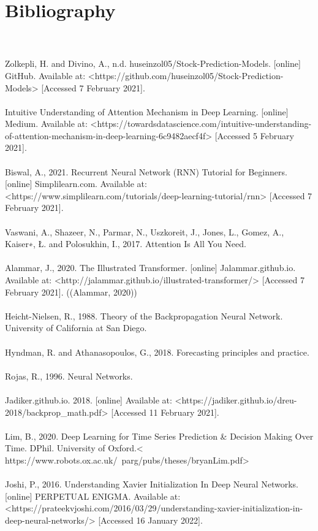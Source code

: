 \documentclass{article}
\begin{document}
\section{Bibliography}
\\
\\
Zolkepli, H. and Divino, A., n.d. huseinzol05/Stock-Prediction-Models. [online] GitHub. Available at: <https://github.com/huseinzol05/Stock-Prediction-Models> [Accessed 7 February 2021].
\\
\\Intuitive Understanding of Attention Mechanism in Deep Learning. [online] Medium. Available at: <https://towardsdatascience.com/intuitive-understanding-of-attention-mechanism-in-deep-learning-6c9482aecf4f> [Accessed 5 February 2021].
\\\\
Biswal, A., 2021. Recurrent Neural Network (RNN) Tutorial for Beginners. [online] Simplilearn.com. Available at: <https://www.simplilearn.com/tutorials/deep-learning-tutorial/rnn> [Accessed 7 February 2021].
\\\\
Vaswani, A., Shazeer, N., Parmar, N., Uszkoreit, J., Jones, L., Gomez, A., Kaiser∗, Ł. and Polosukhin, I., 2017. Attention Is All You Need.
\\\\
Alammar, J., 2020. The Illustrated Transformer. [online] Jalammar.github.io. Available at: <http://jalammar.github.io/illustrated-transformer/> [Accessed 7 February 2021].
((Alammar, 2020))
\\
\\Heicht-Nielsen, R., 1988. Theory of the Backpropagation Neural Network. University of California at San Diego.
\\\\
Hyndman, R. and Athanasopoulos, G., 2018. Forecasting principles and practice.
\\\\
Rojas, R., 1996. Neural Networks.
\\\\
Jadiker.github.io. 2018. [online] Available at: <https://jadiker.github.io/dreu-2018/backprop_math.pdf> [Accessed 11 February 2021].
\\\\
Lim, B., 2020. Deep Learning for Time Series Prediction & Decision Making Over Time. DPhil. University of Oxford.< https://www.robots.ox.ac.uk/~parg/pubs/theses/bryanLim.pdf>
\\\\
Joshi, P., 2016. Understanding Xavier Initialization In Deep Neural Networks. [online] PERPETUAL ENIGMA. Available at: <https://prateekvjoshi.com/2016/03/29/understanding-xavier-initialization-in-deep-neural-networks/> [Accessed 16 January 2022].
\\\\
\end{document}
